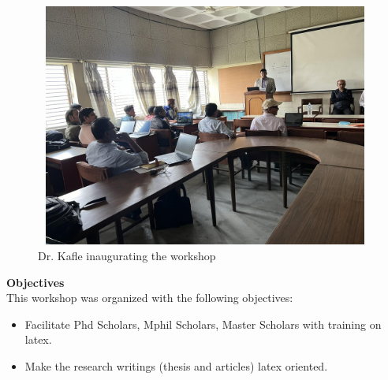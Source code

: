 \documentclass[a4paper,12pt]{report}
\begin{document}
\begin{figure}[hb!]
  \centering
  \includegraphics[width=14cm, height=8cm]{jeevansir.jpg}
  \caption{Dr. Kafle inaugurating the workshop}
\end{figure}
\clearpage


{\Large \textbf{Objectives}}\\

This workshop was organized with the following objectives:
\begin{itemize}
\item Facilitate Phd Scholars, Mphil Scholars, Master Scholars with training on latex.
\item Make the research writings (thesis and articles) latex oriented.
\end{itemize}
\end{document}
